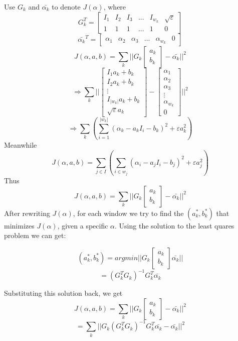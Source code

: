 \documentclass[11pt,letterpaper]{article}
\begin{document}
Use $G_k$ and $\bar{\alpha_k}$  to denote $J(\alpha)$, where
$$ G_k^T=
  \begin{bmatrix}
    I_1 & I_2 & I_3 & ... & I_{w_k} & \sqrt{\varepsilon}\\
    1 & 1 & 1 & ... & 1 & 0 
  \end{bmatrix} $$
$$ \bar{\alpha_k}^T=
  \begin{bmatrix}
    \alpha_1 & \alpha_2 & \alpha_3 & ... & \alpha_{w_k} & 0 
  \end{bmatrix} $$
$$J(\alpha, a, b) = \sum_{k}||G_k \begin{bmatrix} a_k \\ b_k\end{bmatrix} - \bar{\alpha_k}||^2$$
$$\Rightarrow \sum_k||\begin{bmatrix} I_{1} a_k + b_k \\ I_{2} a_k + b_k \\ \vdots \\ I_{|w_k|} a_k + b_k \\ \sqrt{\varepsilon} a_k \end{bmatrix} - 
\begin{bmatrix}
    \alpha_1 \\ \alpha_2 \\ \alpha_3 \\ \vdots\\ \alpha_{w_k} \\ 0 
\end{bmatrix}||^2$$
$$\Rightarrow \sum_{k}(\sum_{i = 1}^{|w_{k}|}(\alpha_k - a_kI_i-b_k)^2+\varepsilon a_k^2)$$
Meanwhile 
$$J(\alpha, a, b) = \sum_{j \in I}(\sum_{i \in w_j}(\alpha_i - a_jI_i-b_j)^2+\varepsilon a_j^2)$$
Thus
$$J(\alpha, a, b) = \sum_{k}||G_k \begin{bmatrix} a_k \\ b_k\end{bmatrix} - \bar{\alpha_k}||^2$$
After rewriting $J(\alpha)$, for each window we try to find the $(a_k^*, b_k^*)$ that minimizes $J(\alpha)$, given a specific $\alpha$. Using the solution to the least quares problem we can get:

$$(a_k^*, b_k^*) = argmin||G_k \begin{bmatrix} a_k \\ b_k\end{bmatrix} \bar{\alpha_k}||$$
$$ = (G_k^TG_k)^{-1}G_k^T \bar{\alpha_k}$$

Substituting this solution back, we get
$$J(\alpha, a, b) = \sum_{k}||G_k \begin{bmatrix} a_k \\ b_k\end{bmatrix} - \bar{\alpha_k}||^2 $$
$$= \sum_{k}||G_k(G_k^TG_k)^{-1}G_k^T \bar{\alpha_k} - \bar{\alpha_k}||^2$$
\end{document}
